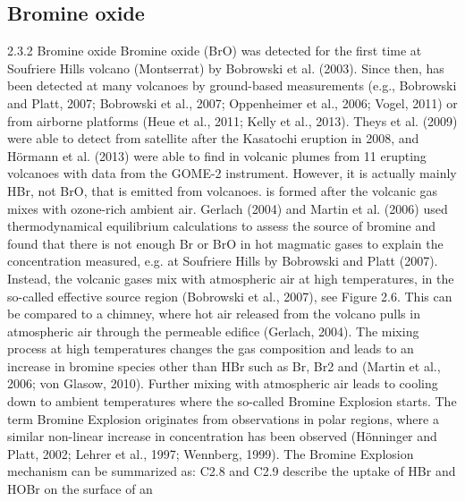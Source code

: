 \documentclass  [
  paper    = a4,
  BCOR     = 10mm,
  twoside,
  fontsize = 12pt,
  fleqn,
  toc      = bibnumbered,
  toc      = listofnumbered,
  numbers  = noendperiod,
  headings = normal,
  listof   = leveldown,
  version  = 3.03
]                                       {scrreprt}
\begin{document}
{	\subsection{Bromine oxide}
		2.3.2 Bromine oxide
	Bromine oxide (BrO) was detected for the first time at Soufriere Hills volcano
	(Montserrat) by Bobrowski et al. (2003). Since then,  has been detected
	at many volcanoes by ground-based measurements (e.g., Bobrowski and Platt,
	2007; Bobrowski et al., 2007; Oppenheimer et al., 2006; Vogel, 2011) or from
	airborne platforms (Heue et al., 2011; Kelly et al., 2013). Theys et al. (2009)
	were able to detect  from satellite after the Kasatochi eruption in 2008, and
	Hörmann et al. (2013) were able to find  in volcanic plumes from 11 erupting
	volcanoes with data from the GOME-2 instrument.
	However, it is actually mainly HBr, not BrO, that is emitted from volcanoes.
	 is formed after the volcanic gas mixes with ozone-rich ambient air. Gerlach
	(2004) and Martin et al. (2006) used thermodynamical equilibrium calculations
	to assess the source of bromine and found that there is not enough Br or BrO
	in hot magmatic gases to explain the  concentration measured, e.g. at
	Soufriere Hills by Bobrowski and Platt (2007). Instead, the volcanic gases mix
	with atmospheric air at high temperatures, in the so-called effective source region
	(Bobrowski et al., 2007), see Figure 2.6. This can be compared to a chimney,
	where hot air released from the volcano pulls in atmospheric air through the
	permeable edifice (Gerlach, 2004). The mixing process at high temperatures
 changes the gas composition and leads to an increase in bromine
	species other than HBr such as Br, Br2 and  (Martin et al., 2006; von Glasow,
	2010). Further mixing with atmospheric air leads to cooling down to ambient
	temperatures where the so-called Bromine Explosion starts. The term Bromine
	Explosion originates from  observations in polar regions, where a similar
	non-linear increase in  concentration has been observed (Hönninger and
	Platt, 2002; Lehrer et al., 1997; Wennberg, 1999).
	The Bromine Explosion mechanism can be summarized as:
	C2.8 and C2.9 describe the uptake of HBr and HOBr on the surface of an
}
\end{document}
